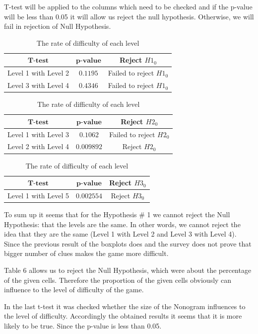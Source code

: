 T-test will be applied to the columns which need to be checked and if the p-value will be less than 0.05 it will allow us reject the null hypothesis. Otherwise, we will fail in rejection of Null Hypothesis.\\ 

\begin{table}[h]
\centering
\begin{tabular}[b]{|c|c|c|}
\hline
$\textbf{T-test}$&$ \textbf{p-value}$&\textbf{Reject $H1_{0}$}\\
\hline
Level 1 with Level 2 & $0.1195$ & Failed to reject $H1_{0}$\\
Level 3 with Level 4 & $0.4346$ & Failed to reject $H1_{0}$\\
\hline
\end{tabular}
\caption{The rate of difficulty of each level}
\label{table:level_rates}
\end{table}


\begin{table}[h]
\centering
\begin{tabular}[b]{|c|c|c|}
\hline
$\textbf{T-test}$&$ \textbf{p-value}$&\textbf{Reject $H2_{0}$}\\
\hline
Level 1 with Level 3 & $0.1062$ & Failed to reject $H2_{0}$\\
Level 2 with Level 4 & $0.009892$ & Reject $H2_{0}$\\
\hline
\end{tabular}
\caption{The rate of difficulty of each level}
\label{table:level_rates}
\end{table}

\begin{table}[h]
\centering
\begin{tabular}[b]{|c|c|c|}
\hline
$\textbf{T-test}$&$ \textbf{p-value}$&\textbf{Reject $H3_{0}$}\\
\hline
Level 1 with Level 5 & $0.002554$ & Reject $H3_{0}$\\
\hline
\end{tabular}
\caption{The rate of difficulty of each level}
\label{table:level_rates}
\end{table}


To sum up it seems that for the Hypothesis \# 1 we cannot reject the Null Hypothesis: that the levels are the same. In other words, we cannot reject the idea that they are the same (Level 1 with Level 2 and Level 3 with Level 4). Since the previous result of the boxplots does and the survey does not prove that bigger number of clues makes the game more difficult. 

Table 6 allows us to reject the Null Hypothesis, which were about the percentage of the given cells. Therefore the proportion of the given cells obviously can influence to the level of difficulty of the game. 
 
In the last t-test it was checked whether the size of the Nonogram influences to the level of difficulty. Accordingly the obtained results it seems that it is more likely to be true. Since the p-value is less than 0.05.




